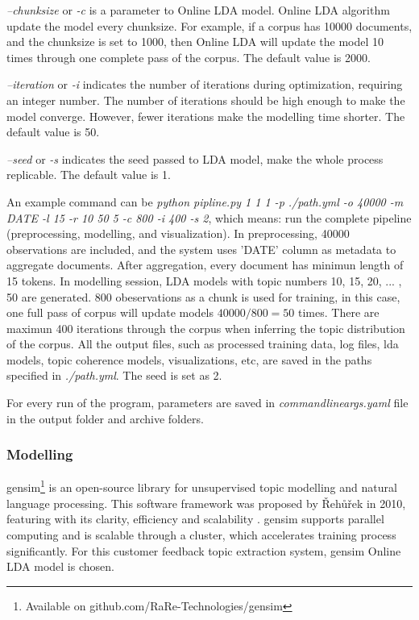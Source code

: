 \documentclass{article} %
\begin{document}
\textit{--chunksize} or \textit{-c} is a parameter to Online LDA model. Online LDA algorithm update the model every chunksize. For example, if a corpus has 10000 documents, and the chunksize is set to 1000, then Online LDA will update the model 10 times through one complete pass of the corpus. The default value is 2000.

\textit{--iteration} or \textit{-i} indicates the number of iterations during optimization, requiring an integer number. The number of iterations should be high enough to make the model converge. However, fewer iterations make the modelling time shorter. The default value is 50.

\textit{--seed} or \textit{-s} indicates the seed passed to LDA model, make the whole process replicable. The default value is 1.

An example command can be \textit{python pipline.py 1 1 1 -p ./path.yml -o 40000 -m DATE -l 15 -r 10 50 5 -c 800 -i 400 -s 2},
which means: run the complete pipeline (preprocessing, modelling, and visualization). In preprocessing, 40000 observations are included, and the
system uses 'DATE' column as metadata to aggregate documents. After aggregation, every document has minimun length of 15 tokens. In modelling session,
LDA models with topic numbers 10, 15, 20, ... , 50 are generated. 800 obeservations as a chunk is used for training, in this case, one full pass of
corpus will update models $40000 / 800 = 50$ times. There are maximun 400 iterations through the corpus when inferring the topic distribution of the corpus.
All the output files, such as processed training data, log files, lda models, topic coherence models, visualizations, etc, are saved in the paths
specified in \textit{./path.yml}. The seed is set as 2.

For every run of the program, parameters are saved in \textit{commandline\textunderscore{}args.yaml} file in the output folder and archive folders.

\subsubsection{Modelling}
gensim\footnote{Available on github.com/RaRe-Technologies/gensim} is an open-source library for unsupervised topic modelling and natural language processing. This software framework was proposed by {\v R}eh{\r u}{\v r}ek in 2010, featuring with its clarity, efficiency and scalability \cite{rehurek_lrec}. gensim supports parallel computing and is scalable through a cluster, which accelerates training process significantly. For this customer feedback topic extraction system, gensim Online LDA model is chosen.
\end{document}
